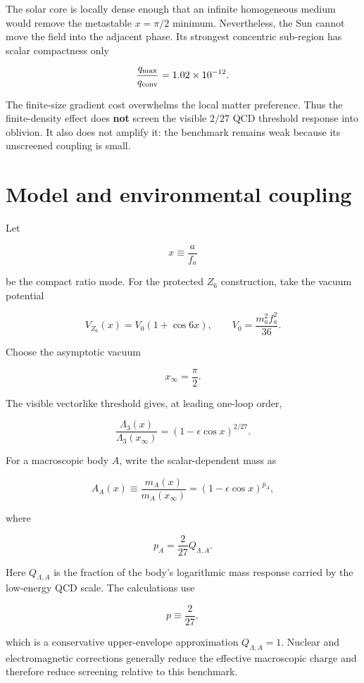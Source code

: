 \documentclass[11pt,a4paper]{article}
\begin{document}
The solar core is locally dense enough that an infinite homogeneous
medium would remove the metastable \(x=\pi/2\) minimum. Nevertheless,
the Sun cannot move the field into the adjacent phase. Its strongest
concentric sub-region has scalar compactness only

\[
\frac{q_{\max}}{q_{\rm conv}}=1.02\times10^{-12}.
\]

The finite-size gradient cost overwhelms the local matter preference.
Thus the finite-density effect does \textbf{not} screen the visible
\(2/27\) QCD threshold response into oblivion. It also does not amplify
it: the benchmark remains weak because its unscreened coupling is small.



\section{Model and environmental
coupling}\label{model-and-environmental-coupling}

Let

\[
x\equiv\frac{a}{f_a}
\]

be the compact ratio mode. For the protected \(Z_6\) construction, take
the vacuum potential

\[
V_{Z_6}(x)=V_0\left(1+\cos 6x\right),
\qquad
V_0=\frac{m_a^2f_a^2}{36}.
\]

Choose the asymptotic vacuum

\[
x_\infty=\frac{\pi}{2}.
\]

The visible vectorlike threshold gives, at leading one-loop order,

\[
\frac{\Lambda_3(x)}{\Lambda_3(x_\infty)}
=
\left(1-\epsilon\cos x\right)^{2/27}.
\]

For a macroscopic body \(A\), write the scalar-dependent mass as

\[
A_A(x)
\equiv
\frac{m_A(x)}{m_A(x_\infty)}
=
\left(1-\epsilon\cos x\right)^{p_A},
\]

where

\[
p_A=\frac{2}{27}Q_{\Lambda,A}.
\]

Here \(Q_{\Lambda,A}\) is the fraction of the body's logarithmic mass
response carried by the low-energy QCD scale. The calculations use

\[
p\equiv\frac{2}{27},
\]

which is a conservative upper-envelope approximation
\(Q_{\Lambda,A}=1\). Nuclear and electromagnetic corrections generally
reduce the effective macroscopic charge and therefore reduce screening
relative to this benchmark.
\end{document}
